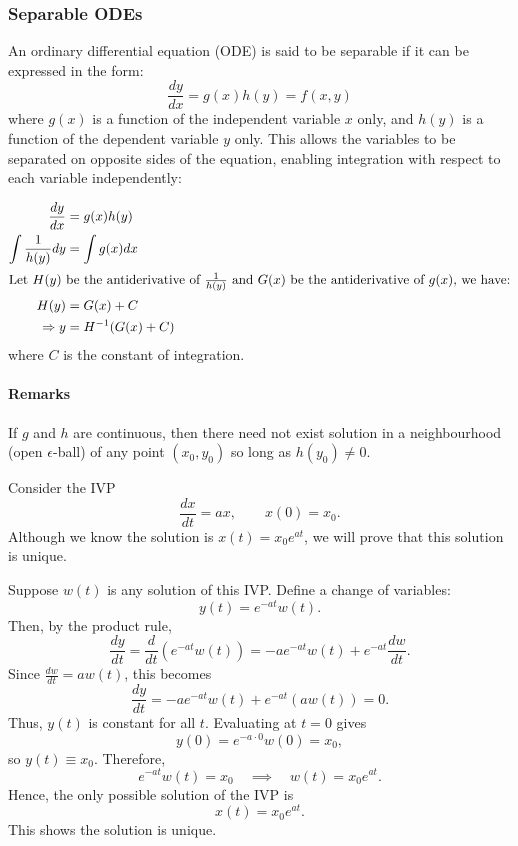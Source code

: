 \documentclass[11pt]{article}
\begin{document}
\subsubsection{Separable ODEs}
\begin{definition}
    An ordinary differential equation (ODE) is said to be separable if it can be expressed in the form:
    $$
    \frac{dy}{dx} = g(x) h(y) = f(x, y)
    $$
    where \( g(x) \) is a function of the independent variable \( x \) only, and \( h(y) \) is a function of the dependent variable \( y \) only. This allows the variables to be separated on opposite sides of the equation, enabling integration with respect to each variable independently:

    \begin{align*}
        \frac{dy}{dx} &= g(x) h(y) \\
        \int \frac{1}{h(y)} dy &= \int g(x) dx \\
        \intertext{Let \( H(y) \) be the antiderivative of \( \frac{1}{h(y)} \) and \( G(x) \) be the antiderivative of \( g(x) \), we have:}
        H(y) &= G(x) + C \\
        \Rightarrow y &= H^{-1}(G(x) + C)
    \end{align*}
    where \( C \) is the constant of integration.
\end{definition}

\paragraph{Remarks} If $g$ and $h$ are continuous, then there need not exist solution in a neighbourhood (open $\epsilon$-ball) of any point $(x_0, y_0)$ so long as $h(y_0) \neq 0$.
\begin{example}
Consider the IVP
\[
\frac{dx}{dt} = ax, \qquad x(0) = x_0.
\]
Although we know the solution is \( x(t) = x_0 e^{at} \), we will prove that this solution is unique.

Suppose $w(t)$ is any solution of this IVP. Define a change of variables:
$$
y(t) = e^{-at} w(t).
$$
Then, by the product rule,
$$
\frac{dy}{dt} = \frac{d}{dt}\!\left( e^{-at} w(t) \right) 
= -a e^{-at} w(t) + e^{-at} \frac{dw}{dt}.
$$
Since $\tfrac{dw}{dt} = aw(t)$, this becomes
$$
\frac{dy}{dt} = -a e^{-at} w(t) + e^{-at} (a w(t)) = 0.
$$
Thus, $y(t)$ is constant for all $t$. Evaluating at $t=0$ gives
$$
y(0) = e^{-a \cdot 0} w(0) = x_0,
$$
so $y(t) \equiv x_0$. Therefore,
$$
e^{-at} w(t) = x_0 \quad \implies \quad w(t) = x_0 e^{at}.
$$
Hence, the only possible solution of the IVP is
$$
x(t) = x_0 e^{at}.
$$
This shows the solution is unique.
\end{example}
\end{document}
